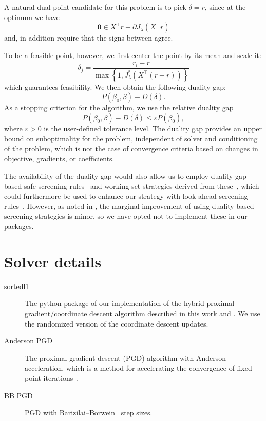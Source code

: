 \documentclass[article]{jss}
\begin{document}
\begin{appendix}
  A natural dual point candidate for this problem is to pick
  \(\delta = r\), since
  at the optimum we have
  \[
    \bm{0} \in X^\intercal r + \partial J_\lambda(X^\intercal r)
  \]
  and, in addition require that the signs between agree.


  To be a feasible point, however, we first center the point by its mean and
  scale it:
  \[
    \delta_j = \frac{r_i - \bar{r}}{\max\left\{1, J_\lambda^*\left(X^\intercal(r - \bar{r})\right) \right\}}
  \]
  which guarantees feasibility. We then obtain the following duality gap:
  \[
    P(\beta_0, \beta) - D(\delta).
  \]
  As a stopping criterion for the algorithm, we use the relative duality gap
  \[
    P(\beta_0, \beta) - D(\delta) \leq \varepsilon P(\beta_0),
  \]
  where \(\varepsilon >0\) is the user-defined tolerance level.
  The duality gap provides an upper bound on suboptimality for the problem, independent
  of solver and conditioning of the problem, which is not the case of
  convergence criteria based on changes in objective, gradients, or coefficients.

  The availability of the duality gap would also allow us to employ
  duality-gap based safe screening rules~\citep{fercoq2015} and
  working set strategies derived from these~\citep{massias2018}, which
  could furthermore be used to enhance our strategy with look-ahead
  screening rules~\citep{larsson2021a}. However,
  as noted in \citet{larsson2022d}, the marginal improvement
  of using duality-based screening strategies is minor, so we have
  opted not to implement these in our packages.

  \section{Solver details}\label{sec:solver-details}

  \begin{description}
    \item[sortedl1] The python package of our implementation of the hybrid
          proximal gradient/coordinate descent algorithm described in this work and
          \citet{larsson2023}. We use the randomized version of the coordinate descent
          updates.
    \item[Anderson PGD] The proximal gradient descent (PGD) algorithm with Anderson acceleration, which is a
          method for accelerating the convergence of fixed-point
          iterations~\citep{anderson1965,zhang2020}.
    \item[BB PGD] PGD with Barizilai--Borwein~\citep{barzilai1988} step sizes.


\end{description}
\end{appendix}
\end{document}
